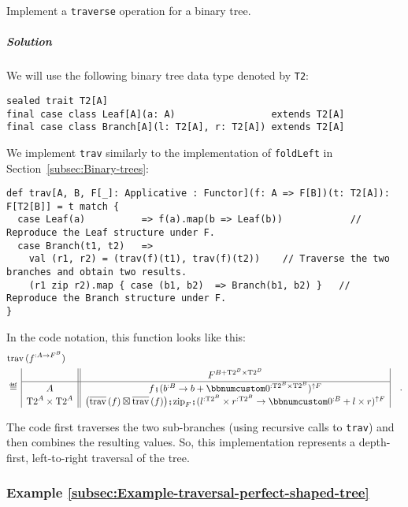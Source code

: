 Implement a \lstinline!traverse! operation for a binary tree.

\subparagraph{Solution}

We will use the following binary tree data type denoted by \lstinline!T2!:
\begin{lstlisting}
sealed trait T2[A]
final case class Leaf[A](a: A)                 extends T2[A]
final case class Branch[A](l: T2[A], r: T2[A]) extends T2[A]
\end{lstlisting}
We implement \lstinline!trav! similarly to the implementation of
\lstinline!foldLeft! in Section~\ref{subsec:Binary-trees}:
\begin{lstlisting}
def trav[A, B, F[_]: Applicative : Functor](f: A => F[B])(t: T2[A]): F[T2[B]] = t match {
  case Leaf(a)          => f(a).map(b => Leaf(b))            // Reproduce the Leaf structure under F.
  case Branch(t1, t2)   =>
    val (r1, r2) = (trav(f)(t1), trav(f)(t2))    // Traverse the two branches and obtain two results.
    (r1 zip r2).map { case (b1, b2)  => Branch(b1, b2) }   // Reproduce the Branch structure under F.
}
\end{lstlisting}
In the code notation, this function looks like this:
\begin{align*}
 & \text{trav}\,(f^{:A\rightarrow F^{B}})\\
 & \triangleq\,\begin{array}{|c||c|}
 & F^{B+\text{T2}^{B}\times\text{T2}^{B}}\\
\hline A & f\bef(b^{:B}\rightarrow b+\bbnum 0^{:\text{T2}^{B}\times\text{T2}^{B}})^{\uparrow F}\\
\text{T2}^{A}\times\text{T2}^{A} & \big(\overline{\text{trav}}\,(f)\boxtimes\overline{\text{trav}}\,(f)\big)\bef\text{zip}_{F}\bef(l^{:\text{T2}^{B}}\times r^{:\text{T2}^{B}}\rightarrow\bbnum 0^{:B}+l\times r)^{\uparrow F}
\end{array}\quad.
\end{align*}

The code first traverses the two sub-branches (using recursive calls
to \lstinline!trav!) and then combines the resulting values. So,
this implementation represents a depth-first, left-to-right traversal
of the tree.

\subsubsection{Example \label{subsec:Example-traversal-perfect-shaped-tree}\ref{subsec:Example-traversal-perfect-shaped-tree}}

